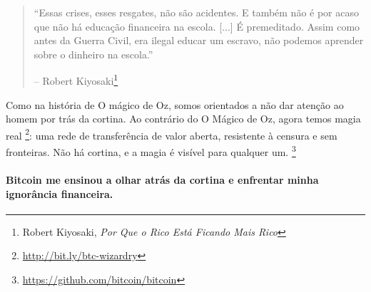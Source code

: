 \begin{quotation}\begin{samepage}
\enquote{Essas crises, esses resgates, não são acidentes. E também não é por acaso que não há educação financeira na escola. [...] É premeditado. Assim como antes da Guerra Civil, era ilegal educar um escravo, não podemos aprender sobre o dinheiro na escola.}
\begin{flushright} -- Robert Kiyosaki\footnote{Robert Kiyosaki, \textit{Por Que o Rico Está Ficando Mais Rico}\cite{robert-kiyosaki}}
\end{flushright}\end{samepage}\end{quotation}

Como na história de O mágico de Oz, somos orientados a não dar atenção ao homem por trás da cortina. Ao contrário do O Mágico de Oz, agora temos magia real \footnote{\url{http://bit.ly/btc-wizardry}}: uma rede de transferência de valor aberta, resistente à censura e sem fronteiras. Não há cortina, e a magia é visível para qualquer um. \footnote{\url{https://github.com/bitcoin/bitcoin}}

\paragraph{Bitcoin me ensinou a olhar atrás da cortina e enfrentar minha ignorância financeira.}

%
%
%
%
